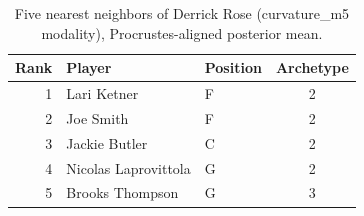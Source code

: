 \begin{table}[htbp]
  \centering\small
  \begin{tabular}{rllc}
    \toprule
    Rank & Player & Position & Archetype \\
    \midrule
    1 & Lari Ketner & F & 2 \\
    2 & Joe Smith & F & 2 \\
    3 & Jackie Butler & C & 2 \\
    4 & Nicolas Laprovittola & G & 2 \\
    5 & Brooks Thompson & G & 3 \\
    \bottomrule
  \end{tabular}
  \caption{Five nearest neighbors of Derrick Rose (curvature_m5 modality), Procrustes-aligned posterior mean.}
  \label{tab:Derrick_Rose_neighbors_curvature_m5}
\end{table}

